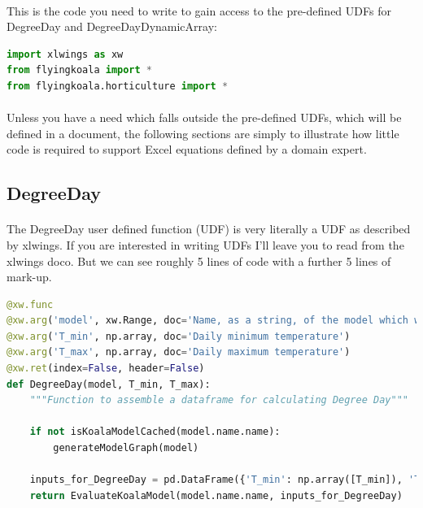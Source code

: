 \documentclass[12pt,a4paper,twoside,openright,titlepage]{article}
\begin{document}
\paragraph{} This is the code you need to write to gain access to the pre-defined UDFs for DegreeDay and DegreeDayDynamicArray:

\begin{lstlisting}[language=Python]
import xlwings as xw
from flyingkoala import *
from flyingkoala.horticulture import *
\end{lstlisting}

\paragraph{} Unless you have a need which falls outside the pre-defined UDFs, which will be defined in a document, the following sections are simply to illustrate how little code is required to support Excel equations defined by a domain expert.

\subsection{DegreeDay}

\paragraph{} The DegreeDay user defined function (UDF) is very literally a UDF as described by xlwings. If you are interested in writing UDFs I'll leave you to read from the xlwings doco. But we can see roughly 5 lines of code with a further 5 lines of mark-up.

\begin{lstlisting}[language=Python]
@xw.func
@xw.arg('model', xw.Range, doc='Name, as a string, of the model which will be evaluated. The Excel cell name / named range')
@xw.arg('T_min', np.array, doc='Daily minimum temperature')
@xw.arg('T_max', np.array, doc='Daily maximum temperature')
@xw.ret(index=False, header=False)
def DegreeDay(model, T_min, T_max):
    """Function to assemble a dataframe for calculating Degree Day"""

    if not isKoalaModelCached(model.name.name):
        generateModelGraph(model)

    inputs_for_DegreeDay = pd.DataFrame({'T_min': np.array([T_min]), 'T_max': np.array([T_max])})
    return EvaluateKoalaModel(model.name.name, inputs_for_DegreeDay)
\end{lstlisting}
\end{document}
